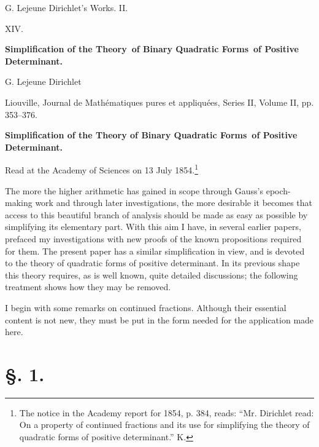\documentclass[11pt]{article}
\begin{document}
\begin{center}
{\Large G. Lejeune Dirichlet's Works. II.}\par\vspace{1.2em}
{\Large XIV.}\par\vspace{0.5em}
{\LARGE \textbf{Simplification of the Theory\ of Binary Quadratic Forms\ of Positive Determinant.}}\par\vspace{1em}
{\large G. Lejeune Dirichlet}\par\vspace{0.5em}
{\small Liouville, Journal de Mathématiques pures et appliquées, Series II, Volume II, pp. 353--376.}
\end{center}

\begin{center}
{\large \textbf{Simplification of the Theory of Binary Quadratic Forms\ of Positive Determinant.}}\par
{\small Read at the Academy of Sciences on 13 July 1854.\footnote{The notice in the Academy report for 1854, p. 384, reads: ``Mr. Dirichlet read: On a property of continued fractions and its use for simplifying the theory of quadratic forms of positive determinant.'' K.}}
\end{center}

The more the higher arithmetic has gained in scope through Gauss's epoch-making work and through later investigations, the more desirable it becomes that access to this beautiful branch of analysis should be made as easy as possible by simplifying its elementary part. With this aim I have, in several earlier papers, prefaced my investigations with new proofs of the known propositions required for them. The present paper has a similar simplification in view, and is devoted to the theory of quadratic forms of positive determinant. In its previous shape this theory requires, as is well known, quite detailed discussions; the following treatment shows how they may be removed.

I begin with some remarks on continued fractions. Although their essential content is not new, they must be put in the form needed for the application made here.

\section*{\S. 1.}
\end{document}
